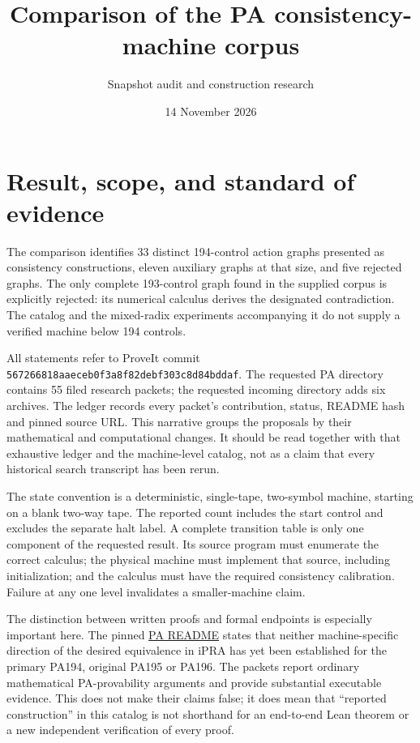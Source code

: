 \documentclass[10pt]{article}
\title{Comparison of the PA consistency-machine corpus}
\author{Snapshot audit and construction research}
\date{14 November 2026}
\newcommand{\packet}[1]{\texttt{\detokenize{#1}}}
\begin{document}
\maketitle

\section{Result, scope, and standard of evidence}

The comparison identifies 33 distinct 194-control action graphs presented as
consistency constructions, eleven auxiliary graphs at that size, and five
rejected graphs. The only complete 193-control graph found in the supplied
corpus is explicitly rejected: its numerical calculus derives the designated
contradiction. The catalog and the mixed-radix experiments accompanying it do
not supply a verified machine below 194 controls.

All statements refer to ProveIt commit
\texttt{567266818aaeceb0f3a8f82debf303c8d84bddaf}. The requested PA directory
contains 55 filed research packets; the requested incoming directory adds six
archives. The ledger \packet{packet_ledger_61.json} records every packet's
contribution, status, README hash and pinned source URL. This narrative groups
the proposals by their mathematical and computational changes. It should be
read together with that exhaustive ledger and the machine-level catalog, not
as a claim that every historical search transcript has been rerun.

The state convention is a deterministic, single-tape, two-symbol machine,
starting on a blank two-way tape. The reported count includes the start control
and excludes the separate halt label. A complete transition table is only one
component of the requested result. Its source program must enumerate the
correct calculus; the physical machine must implement that source, including
initialization; and the calculus must have the required consistency calibration.
Failure at any one level invalidates a smaller-machine claim.

The distinction between written proofs and formal endpoints is especially
important here. The pinned
\href{https://github.com/VladimirReshetnikov/ProveIt/blob/567266818aaeceb0f3a8f82debf303c8d84bddaf/Computability/BusyBeaver/Research/PA/README.md}{PA README}
states that neither machine-specific direction of the desired equivalence in
iPRA has yet been established for the primary PA194, original PA195 or PA196.
The packets report ordinary mathematical PA-provability arguments and provide
substantial executable evidence. This does not make their claims false; it
does mean that ``reported construction'' in this catalog is not shorthand for
an end-to-end Lean theorem or a new independent verification of every proof.
\end{document}
